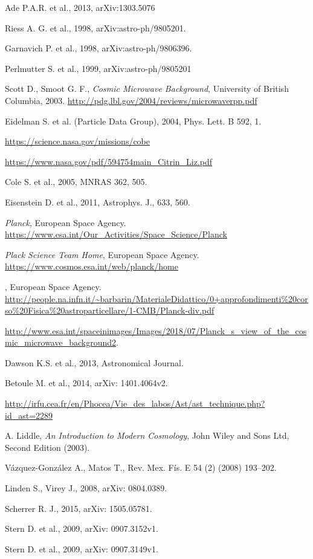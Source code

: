\documentclass[onecolumn,           %
               showpacs,            %
               preprintnumbers,     %
               aps,                 %
               letterpaper,             %
               superscriptaddress,      %
               nofootinbib,         %
               tightenlines,        %
               floats,floatfix      %
               ,usenatbib,
               ]{revtex4-1}
\begin{document}
\begin{thebibliography}{9}
 Ade P.A.R. et al., 2013, arXiv:1303.5076

 Riess A. G. et al., 1998, 	arXiv:astro-ph/9805201.

 Garnavich P. et al., 1998, arXiv:astro-ph/9806396. 

 Perlmutter S. et al., 1999, arXiv:astro-ph/9805201

 Scott D.,  Smoot G. F., {\em Cosmic Microwave Background}, University of British Columbia, 2003. \url{http://pdg.lbl.gov/2004/reviews/microwaverpp.pdf} 

 Eidelman S. et al. (Particle Data Group), 2004, Phys. Lett. B 592, 1.

\url{https://science.nasa.gov/missions/cobe}

\url{https://www.nasa.gov/pdf/594754main_Citrin_Liz.pdf}

 Cole S. et al., 2005, MNRAS 362, 505.

 Eisenstein D. et al., 2011, Astrophys. J., 633, 560.

 {\em Planck}, European Space Agency. \url{https://www.esa.int/Our_Activities/Space_Science/Planck}

 {\em Plack Science Team Home}, European Space Agency. \url{https://www.cosmos.esa.int/web/planck/home}

, European Space Agency. \url{http://people.na.infn.it/~barbarin/MaterialeDidattico/0+approfondimenti%20corso%20Fisica%20astroparticellare/1-CMB/Planck-div.pdf}
	
\url{http://www.esa.int/spaceinimages/Images/2018/07/Planck_s_view_of_the_cosmic_microwave_background2}.

 Dawson K.S. et al., 2013, Astronomical Journal.

 Betoule M. et al., 2014, arXiv: 1401.4064v2.

 \url{http://irfu.cea.fr/en/Phocea/Vie_des_labos/Ast/ast_technique.php?id_ast=2289}

 A. Liddle, {\em An Introduction to Modern Cosmology}, John Wiley and Sons Ltd, Second Edition (2003).

 Vázquez-González A., Matos T., Rev. Mex. Fís. E 54 (2) (2008) 193–202.

 Linden S., Virey J., 2008, arXiv: 0804.0389.

 Scherrer R. J., 2015, arXiv: 1505.05781.

 Stern D. et al., 2009, arXiv: 0907.3152v1.

 Stern D. et al., 2009, arXiv: 0907.3149v1.

\end{thebibliography}
\end{document}
